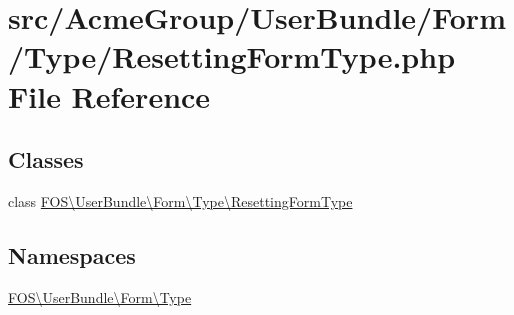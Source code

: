 \hypertarget{_resetting_form_type_8php}{\section{src/\+Acme\+Group/\+User\+Bundle/\+Form/\+Type/\+Resetting\+Form\+Type.php File Reference}
\label{_resetting_form_type_8php}
}
\subsection*{Classes}
\begin{DoxyCompactItemize}
\item 
class \hyperlink{class_f_o_s_1_1_user_bundle_1_1_form_1_1_type_1_1_resetting_form_type}{F\+O\+S\textbackslash{}\+User\+Bundle\textbackslash{}\+Form\textbackslash{}\+Type\textbackslash{}\+Resetting\+Form\+Type}
\end{DoxyCompactItemize}
\subsection*{Namespaces}
\begin{DoxyCompactItemize}
\item 
 \hyperlink{namespace_f_o_s_1_1_user_bundle_1_1_form_1_1_type}{F\+O\+S\textbackslash{}\+User\+Bundle\textbackslash{}\+Form\textbackslash{}\+Type}
\end{DoxyCompactItemize}
